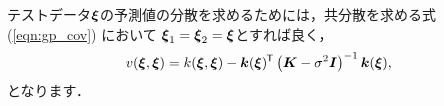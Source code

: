 テストデータ$\boldsymbol{\xi}$の予測値の分散を求めるためには，共分散を求める式 (\ref{eqn:gp_cov}) において
$\boldsymbol{\xi}_1 =\boldsymbol{\xi}_2 = \boldsymbol{\xi}$とすれば良く，
\begin{equation}
    v(\boldsymbol{\xi}, \boldsymbol{\xi}) = k(\boldsymbol{\xi}, \boldsymbol{\xi})
    - \boldsymbol{k}(\boldsymbol{\xi})^{\mkern-1.5mu\mathsf{T}} \left( \boldsymbol{K} - \sigma^2 \boldsymbol{I} \right)^{-1} \boldsymbol{k}(\boldsymbol{\xi}),
\end{equation}
となります．


